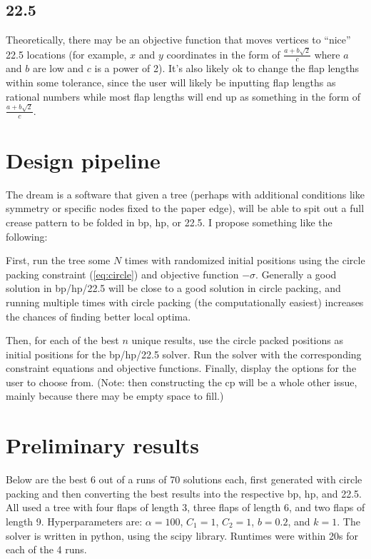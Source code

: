 \documentclass[12pt]{article}
\begin{document}
\subsection{22.5}
Theoretically, there may be an objective function that moves vertices to ``nice'' 22.5 locations (for example, $x$ and $y$ coordinates in the form of $\frac{a+b\sqrt2}{c}$ where $a$ and $b$ are low and $c$ is a power of 2). It's also likely ok to change the flap lengths within some tolerance, since the user will likely be inputting flap lengths as rational numbers while most flap lengths will end up as something in the form of $\frac{a+b\sqrt2}{c}$.

\section{Design pipeline}
The dream is a software that given a tree (perhaps with additional conditions like symmetry or specific nodes fixed to the paper edge), will be able to spit out a full crease pattern to be folded in bp, hp, or 22.5. I propose something like the following:

First, run the tree some $N$ times with randomized initial positions using the circle packing constraint (\ref{eq:circle}) and objective function $-\sigma$. Generally a good solution in bp/hp/22.5 will be close to a good solution in circle packing, and running multiple times with circle packing (the computationally easiest) increases the chances of finding better local optima. 

Then, for each of the best $n$ unique results, use the circle packed positions as initial positions for the bp/hp/22.5 solver. Run the solver with the corresponding constraint equations and objective functions. Finally, display the options for the user to choose from. (Note: then constructing the cp will be a whole other issue, mainly because there may be empty space to fill.)

\section{Preliminary results}
Below are the best 6 out of a runs of 70 solutions each, first generated with circle packing and then converting the best results into the respective bp, hp, and 22.5. All used a tree with four flaps of length 3, three flaps of length 6, and two flaps of length 9. Hyperparameters are: $\alpha=100$, $C_1=1$, $C_2=1$, $b=0.2$, and $k=1$. The solver is written in python, using the scipy library. Runtimes were within 20s for each of the 4 runs.
\end{document}
